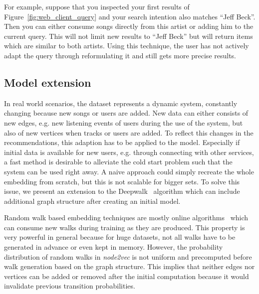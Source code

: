\documentclass[sigconf]{acmart}
\begin{document}
For example, suppose that you inspected your first results of Figure~\ref{fig:web_client_query} and your search intention also matches ``Jeff Beck''. Then you can either consume songs directly from this artist or adding him to the current query. This will not limit new results to ``Jeff Beck'' but will return items which are similar to both artists. Using this technique, the user has not actively adapt the query through reformulating it and still gets more precise results.


\subsection{Model extension}
\label{sec:model_extension}

In real world scenarios, the dataset represents a dynamic system, constantly changing because new songs or users are added. New data can either consists of new edges, e.g. new listening events of users during the use of the system, but also of new vertices when tracks or users are added. To reflect this changes in the recommendations, this adaption has to be applied to the model. Especially if initial data is available for new users, e.g. through connecting with other services, a fast method is desirable to alleviate the cold start problem such that the system can be used right away. A naive approach could simply recreate the whole embedding from scratch, but this is not scalable for bigger sets. To solve this issue, we present an extension to the Deepwalk~\cite{perozzi2014deepwalk} algorithm which can include additional graph structure after creating an initial model.

 

Random walk based embedding techniques are mostly online algorithms~\cite{goyal2017graph}\cite{grover2016node2vec} which can consume new walks during training as they are produced. This property is very powerful in general because for huge datasets, not all walks have to be generated in advance or even kept in memory. However, the probability distribution of random walks in \emph{node2vec} is not uniform and precomputed before walk generation based on the graph structure. This implies that neither edges nor vertices can be added or removed after the initial computation because it would invalidate previous transition probabilities.
\end{document}
